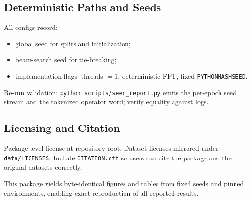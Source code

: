 \documentclass[12pt]{article}
\numberwithin{equation}{section}
\theoremstyle{plain}
\theoremstyle{definition}
\theoremstyle{remark}
\begin{document}
\subsection*{Deterministic Paths and Seeds}
All configs record:
\begin{itemize}
  \item global seed for splits and initialization;
  \item beam-search seed for tie-breaking;
  \item implementation flags: threads \(=1\), deterministic FFT, fixed \texttt{PYTHONHASHSEED}.
\end{itemize}
Re-run validation: \texttt{python scripts/seed\_report.py} emits the per-epoch seed stream and the tokenized operator word; verify equality against logs.

\subsection*{Licensing and Citation}
Package-level license at repository root. Dataset licenses mirrored under \texttt{data/LICENSES}. Include \texttt{CITATION.cff} so users can cite the package and the original datasets correctly.

\medskip
\noindent This package yields byte-identical figures and tables from fixed seeds and pinned environments, enabling exact reproduction of all reported results.
\end{document}
